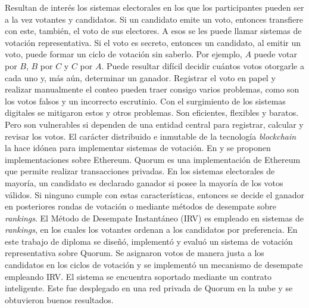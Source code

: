 \begin{resumen}
	Resultan de inter\'es los sistemas electorales en los que los participantes pueden ser a la vez votantes y candidatos. Si un candidato emite un voto, entonces transfiere con este, tambi\'en, el voto de sus electores. A esos se les puede llamar sistemas de votaci\'on representativa. Si el voto es secreto, entonces un candidato, al emitir un voto, puede formar un ciclo de votaci\'on sin saberlo. Por ejemplo, $A$ puede votar por $B$, $B$ por $C$ y $C$ por $A$. Puede resultar dif\'icil decidir cu\'antos votos otorgarle a cada uno y, m\'as a\'un, determinar un ganador. Registrar el voto en papel y realizar manualmente el conteo pueden traer consigo varios problemas, como son los votos falsos y un incorrecto escrutinio. Con el surgimiento de los sistemas digitales se mitigaron estos y otros problemas.  Son eficientes, flexibles y baratos. Pero son vulnerables si dependen de una entidad central para registrar, calcular y revisar los votos. El car\'acter distribuido e inmutable de la tecnolog\'ia \textit{blockchain} la hace id\'onea para implementar sistemas de votaci\'on. En \cite{ovn} y \cite{borda_count} se proponen implementaciones sobre Ethereum. Quorum es una implementaci\'on de Ethereum que permite realizar transacciones privadas. En los sistemas electorales de mayor\'ia, un candidato es declarado ganador si posee la mayor\'ia de los votos v\'alidos. Si ninguno cumple con estas caracter\'isticas, entonces se decide el ganador en posteriores rondas de votaci\'on o mediante m\'etodos de desempate sobre \textit{rankings}. El M\'etodo de Desempate Instant\'aneo (IRV) es empleado en sistemas de \textit{rankings}, en los cuales los votantes ordenan a los candidatos por preferencia. En este trabajo de diploma se dise\~n\'o, implement\'o y evalu\'o un sistema de votaci\'on  representativa sobre Quorum.  Se asignaron votos de manera justa a los candidatos en los ciclos de votaci\'on y se implement\'o un mecanismo de desempate empleando IRV. El sistema se encuentra soportado mediante un contrato inteligente. Este fue desplegado en una red privada de Quorum en la nube y se obtuvieron buenos resultados.
\end{resumen}

